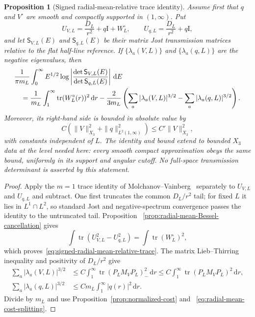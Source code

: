 \documentclass[11pt]{article}
\newcommand{\Id}{\mathrm I}
\newcommand{\dd}{\,\mathrm d}
\DeclareMathOperator{\tr}{tr}
\newtheorem{proposition}[theorem]{Proposition}
\theoremstyle{definition}
\theoremstyle{remark}
\begin{document}
\begin{proposition}[Signed radial-mean-relative trace identity]
\label{prop:signed-radial-mean-relative-trace}
Assume first that $q$ and $V^\circ$ are smooth and compactly supported in
$(1,\infty)$.  Put
\begin{equation}
 U_{V,L}=\frac{D_L}{r^2}+q\Id+W_L^\circ,
 \qquad
 U_{q,L}=\frac{D_L}{r^2}+q\Id,
\end{equation}
and let $\mathsf S_{V,L}(E)$ and $\mathsf S_{q,L}(E)$ be their matrix Jost
transmission matrices relative to the flat half-line reference.  If
$\{\lambda_a(V,L)\}$ and $\{\lambda_a(q,L)\}$ are the negative eigenvalues,
then
\begin{align}
 &\frac1{\pi m_L}\int_0^\infty E^{1/2}
 \log\left|\frac{\det\mathsf S_{V,L}(E)}
                    {\det\mathsf S_{q,L}(E)}\right|\dd E
 \notag\\
 &\quad=\frac1{m_L}\int_1^\infty\tr(W_L^\circ(r))^2\dd r
 -\frac{2}{3m_L}\left(
   \sum_a|\lambda_a(V,L)|^{3/2}
  -\sum_a|\lambda_a(q,L)|^{3/2}\right).
 \label{eq:signed-radial-mean-relative-trace}
\end{align}
Moreover, its right-hand side is bounded in absolute value by
\begin{equation}
 C\left(\|V\|_{X_3}^2+\|q\|_{L^2(1,\infty)}^2\right)
 \leq C'\|V\|_{X_3}^2,
 \label{eq:signed-relative-trace-uniform-bound}
\end{equation}
with constants independent of $L$.  The identity and bound extend to bounded
$X_3$ data at the level needed here: every smooth compact approximation obeys
the same bound, uniformly in its support and angular cutoff.  No full-space
transmission determinant is asserted by this statement.
\end{proposition}

\begin{proof}
Apply the $m=1$ trace identity of
Molchanov--Vainberg~\cite[Theorem~7]{MolchanovVainberg2004} separately to
$U_{V,L}$ and $U_{q,L}$ and subtract.  One first truncates the common
$D_L/r^2$ tail; for fixed $L$ it lies in $L^1\cap L^2$, so standard Jost and
negative-spectrum convergence passes the identity to the untruncated tail.
Proposition
~\ref{prop:radial-mean-Bessel-cancellation} gives
\begin{equation}
 \int\tr(U_{V,L}^2-U_{q,L}^2)
 =\int\tr(W_L^\circ)^2,
\end{equation}
which proves~\eqref{eq:signed-radial-mean-relative-trace}.  The matrix
Lieb--Thirring inequality and positivity of $D_L/r^2$ give
\begin{align}
 \sum_a|\lambda_a(V,L)|^{3/2}
 &\leq C\int_1^\infty
       \tr(P_LM_VP_L)_-^2\dd r
 \leq C\int_1^\infty\tr(P_LM_VP_L)^2\dd r,\\
 \sum_a|\lambda_a(q,L)|^{3/2}
 &\leq C m_L\int_1^\infty |q(r)|^2\dd r.
\end{align}
Divide by $m_L$ and use Proposition~\ref{prop:normalized-cost} and
~\eqref{eq:radial-mean-cost-splitting}.
\end{proof}
\end{document}
